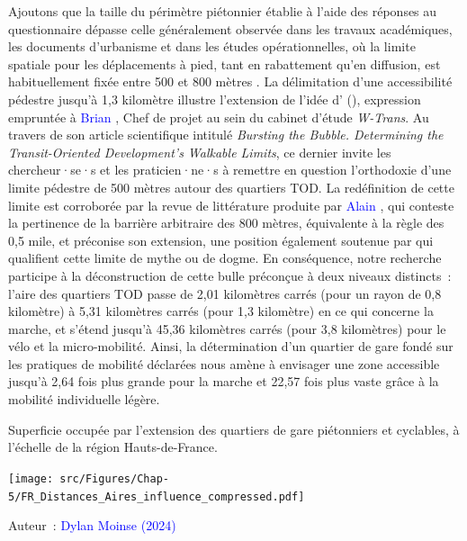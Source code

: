 \begin{refsegment}
Ajoutons que la taille du périmètre piétonnier établie à l'aide des réponses au questionnaire dépasse celle généralement observée dans les travaux académiques, les documents d'urbanisme et dans les études opérationnelles, où la limite spatiale pour les déplacements à pied, tant en rabattement qu'en diffusion, est habituellement fixée entre 500 et 800 mètres \textcolor{blue}{\autocite[133]{pojani_transit-oriented_2015}}. La délimitation d'une accessibilité pédestre jusqu'à 1,3 kilomètre illustre l'extension de l'idée d' (), expression empruntée à \textcolor{blue}{Brian} \textcolor{blue}{\textcite[34]{canepa_bursting_2007}}, Chef de projet au sein du cabinet d'étude \textsl{W-Trans}. Au travers de son article scientifique intitulé \textsl{Bursting the Bubble. Determining the Transit-Oriented Development’s Walkable Limits}, ce dernier invite les chercheur·se·s et les praticien·ne·s à remettre en question l'orthodoxie d'une limite pédestre de 500 mètres autour des quartiers \acrshort{TOD}. La redéfinition de cette limite est corroborée par la revue de littérature produite par \textcolor{blue}{Alain} \textcolor{blue}{\textcite[5]{lhostis_perimetres_2016}}, qui conteste la pertinence de la barrière arbitraire des 800 mètres, équivalente à la règle des 0,5 mile, et préconise son extension, une position également soutenue par \textcolor{blue}{\textcite[79]{ker_myths_2003}} qui qualifient cette limite de mythe ou de dogme. En conséquence, notre recherche participe à la déconstruction de cette bulle préconçue à deux niveaux distincts~: l'aire des quartiers \acrshort{TOD} passe de 2,01 kilomètres carrés (pour un rayon de 0,8 kilomètre) à 5,31 kilomètres carrés (pour 1,3 kilomètre) en ce qui concerne la marche, et s'étend jusqu'à 45,36 kilomètres carrés (pour 3,8 kilomètres) pour le vélo et la micro-mobilité. Ainsi, la détermination d'un quartier de gare fondé sur les pratiques de mobilité déclarées nous amène à envisager une zone accessible jusqu'à 2,64 fois plus grande pour la marche et 22,57 fois plus vaste grâce à la mobilité individuelle légère.%

    \begin{carte}[h!]\vspace*{4pt}
        \caption{Superficie occupée par l'extension des quartiers de gare piétonniers et cyclables, à l'échelle de la région Hauts-de-France.}
        \label{fig-chap5:aires-influence}
        \centerline{\texttt{[image: src/Figures/Chap-5/FR\_Distances\_Aires\_influence\_compressed.pdf]}}
        \vspace{5pt}
        \begin{flushright}\scriptsize{
        Auteur~: \textcolor{blue}{Dylan Moinse (2024)}
        }\end{flushright}
    \end{carte}
    

\end{refsegment}
